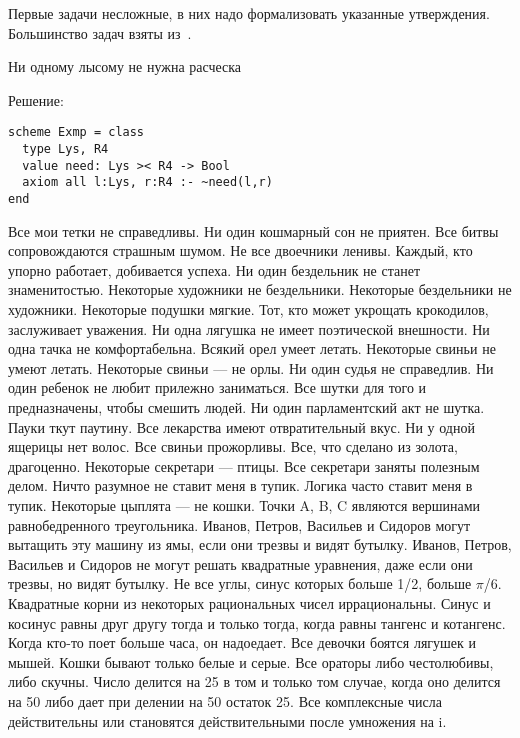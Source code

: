 

Первые задачи несложные, в них надо формализовать указанные утверждения. Большинство задач взяты из~\cite{nepeivoda}.


\z Ни одному лысому не нужна расческа

Решение:
\begin{lstlisting}
scheme Exmp = class
  type Lys, R4
  value need: Lys >< R4 -> Bool
  axiom all l:Lys, r:R4 :- ~need(l,r)
end
\end{lstlisting}


\z Все мои тетки не справедливы.
\z Ни один кошмарный сон не приятен.
\z  Все битвы сопровождаются страшным шумом.
\z Не все двоечники ленивы.
\z  Каждый, кто упорно работает, добивается успеха.
\z  Ни один бездельник не станет знаменитостью.
\z  Некоторые художники не бездельники.
\z  Некоторые бездельники не художники.
\z  Некоторые подушки мягкие.
\z  Тот, кто может укрощать крокодилов, заслуживает уважения.
\z  Ни одна лягушка не имеет поэтической внешности.
\z  Ни одна тачка не комфортабельна.
\z  Всякий орел умеет летать.
\z  Некоторые свиньи не умеют летать.
\z  Некоторые свиньи --- не орлы.
\z  Ни один судья не справедлив.
\z  Ни один ребенок не любит прилежно заниматься.
\z  Все шутки для того и предназначены, чтобы смешить людей.
\z  Ни один парламентский акт не шутка.
\z  Пауки ткут паутину.
\z  Все лекарства имеют отвратительный вкус.
\z  Ни у одной ящерицы нет волос.
\z  Все свиньи прожорливы.
\z  Все, что сделано из золота, драгоценно.
\z  Некоторые секретари --- птицы.
\z  Все секретари заняты полезным делом.
\z  Ничто разумное не ставит меня в тупик.
\z  Логика часто ставит меня в тупик.
\z  Некоторые цыплята --- не кошки.
\z Точки A, B, C являются вершинами равнобедренного треугольника.
\z Иванов, Петров, Васильев и Сидоров могут вытащить эту машину из ямы, если они трезвы и видят бутылку.
\z Иванов, Петров, Васильев и Сидоров не могут решать квадратные уравнения, даже если они трезвы, но видят бутылку.
\z Не все углы, синус которых больше 1/2, больше $\pi$/6.
\z Квадратные корни из некоторых рациональных чисел иррациональны.
\z Синус и косинус равны друг другу тогда и только тогда, когда равны тангенс и котангенс.
\z  Когда кто-то поет больше часа, он надоедает.
\z Все девочки боятся лягушек и мышей.
\z Кошки бывают только белые и серые.
\z  Все ораторы либо честолюбивы, либо скучны.
\z Число делится на 25 в том и только том случае, когда оно делится на 50 либо дает при делении на 50 остаток 25.
\z Все комплексные числа действительны или становятся действительными после умножения на i.

